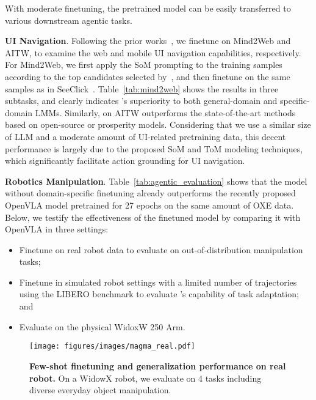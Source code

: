 With moderate finetuning, the pretrained \magma model can be easily transferred to various downstream agentic tasks.

\noindent \textbf{{UI Navigation}}. Following the prior works~\cite{seeclick,cogagent}, we finetune \magma on Mind2Web and AITW, to examine the web and mobile UI navigation capabilities, respectively. For Mind2Web, we first apply the SoM prompting to the training samples according to the top candidates selected by~\cite{zheng2023seeact}, and then finetune \magma on the same samples as in SeeClick~\cite{seeclick}. Table~\ref{tab:mind2web} shows the results in three subtasks, and clearly indicates \magma's superiority to both general-domain and specific-domain LMMs. Similarly, on AITW \magma outperforms the state-of-the-art methods based on open-source or prosperity models. Considering that we use a similar size of LLM and a moderate amount of UI-related pretraining data, this decent performance is largely due to the proposed SoM and ToM modeling techniques, which significantly facilitate action grounding for UI navigation.

\noindent \textbf{{Robotics Manipulation}}. Table~\ref{tab:agentic_evaluation} shows that the \magma model without domain-specific finetuning already outperforms the recently proposed OpenVLA model pretrained for 27 epochs on the same amount of OXE data. Below, we testify the effectiveness of the finetuned \magma model by comparing it with OpenVLA in three settings:
\begin{itemize}
    \item Finetune on real robot data to evaluate on out-of-distribution manipulation tasks;
    \item Finetune in simulated robot settings with a limited number of trajectories using the LIBERO benchmark to evaluate \magma's capability of task adaptation; and
    \item Evaluate on the physical WidoxW 250 Arm.
\end{itemize}

\begin{figure}[!t]
    \centering
    \texttt{[image: figures/images/magma\_real.pdf]}
    \vspace{-5pt}
    \caption{\textbf{Few-shot finetuning and generalization performance on real robot.} On a WidowX robot, we evaluate \magma on 4 tasks including diverse everyday object manipulation.}
    \label{fig:real}
\vspace{-10pt}
\end{figure}


